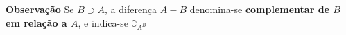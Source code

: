 \documentclass[11pt, openright, a4paper, brazil, english, french, spanish, bibjustif, openany, oneside]{abntex2}
\begin{document}
\begin{SingleSpace}
\textbf{Observação} Se $B \supset A$, a diferença $A - B$ denomina-se \textbf{complementar de $B$ em relação a $A$}, e indica-se $\complement_{A^{B}}$

\end{SingleSpace}
\end{document}
